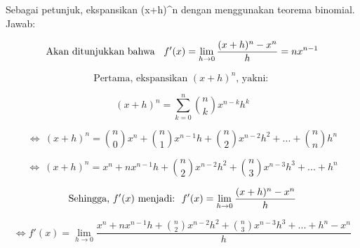 \documentclass[a4paper,10pt]{article}
\begin{document}
\begin{eulernotebook}
\begin{eulercomment}
\begin{eulercomment}
\begin{eulercomment}
\begin{eulercomment}
\begin{eulercomment}
\begin{eulercomment}
\begin{eulercomment}
\begin{eulercomment}
\begin{eulercomment}
\begin{eulercomment}
\begin{eulercomment}
Sebagai petunjuk, ekspansikan (x+h)\textasciicircum{}n dengan menggunakan teorema
binomial.\\
Jawab:\\
\end{eulercomment}
\begin{eulerformula}
\[
\text{Akan ditunjukkan bahwa \: $f'(x)=\lim_{h\to 0} \frac{(x+h)^n-x^n}{h}=nx^{n-1}$}
\]
\end{eulerformula}
\begin{eulercomment}
\end{eulercomment}
\begin{eulerformula}
\[
\text{Pertama, ekspansikan $(x+h)^n$, yakni: }
\]
\end{eulerformula}
\begin{eulercomment}
\end{eulercomment}
\begin{eulerformula}
\[
\text{$(x+h)^n=\sum_{k=0}^{n} \binom{n}{k}x^{n-k}h^k$}
\]
\end{eulerformula}
\begin{eulercomment}
\end{eulercomment}
\begin{eulerformula}
\[
\text{$\Leftrightarrow \: (x+h)^n=\binom{n}{0}x^{n}+\binom{n}{1}x^{n-1}h+\binom{n}{2}x^{n-2}h^2+ ...+\binom{n}{n}h^n$}
\]
\end{eulerformula}
\begin{eulercomment}
\end{eulercomment}
\begin{eulerformula}
\[
\text{$\Leftrightarrow \: (x+h)^n=x^{n}+nx^{n-1}h+\binom{n}{2}x^{n-2}h^2+\binom{n}{3}x^{n-3}h^3+ ...+h^n$}
\]
\end{eulerformula}
\begin{eulercomment}
\end{eulercomment}
\begin{eulerformula}
\[
\text{Sehingga, $f'(x)$ menjadi:\: $f'(x)=\lim_{h\to 0} \frac{(x+h)^n-x^n}{h}$}
\]
\end{eulerformula}
\begin{eulercomment}
\end{eulercomment}
\begin{eulerformula}
\[
\text{$\Leftrightarrow f'(x)=\lim_{h\to 0} \frac{x^{n}+nx^{n-1}h+\binom{n}{2}x^{n-2}h^2+\binom{n}{3}x^{n-3}h^3+ ...+h^n-x^n}{h}$}
\]
\end{eulerformula}
\begin{eulercomment}
\end{eulercomment}
\begin{eulerformula}

\end{eulerformula}
\end{eulercomment}
\end{eulercomment}
\end{eulercomment}
\end{eulercomment}
\end{eulercomment}
\end{eulercomment}
\end{eulercomment}
\end{eulercomment}
\end{eulercomment}
\end{eulercomment}
\end{eulernotebook}
\end{document}
